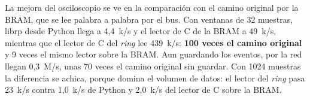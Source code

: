 La mejora del osciloscopio se ve en la comparación con el
camino original por la BRAM, que se lee palabra a palabra por el bus. Con
ventanas de 32 muestras, librp desde Python llega a 4,4~k/s y el lector
de C de la BRAM a 49~k/s, mientras que el lector de C del \emph{ring} lee
439~k/s: \textbf{100 veces el camino original} y 9 veces el mismo lector
sobre la BRAM. Aun guardando los eventos, por la red llegan 0,3~M/s, unas
70 veces el camino original sin guardar. Con 1024 muestras la diferencia se
achica, porque domina el volumen de datos: el lector del \emph{ring} pasa
23~k/s contra 1,0~k/s de Python y 2,0~k/s del lector de C
sobre la BRAM.

